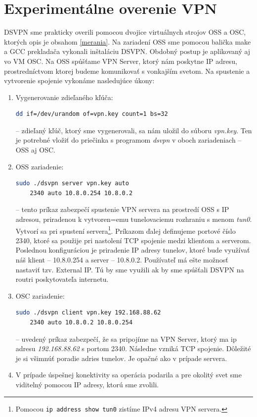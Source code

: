 \section{Experimentálne overenie VPN}
DSVPN sme prakticky overili pomocou dvojice virtuálnych strojov OSS a OSC, ktorých opis je obsahom \ref{merania}. Na zariadení OSS sme pomocou balička make a GCC prekladača vykonali inštaláciu DSVPN. Obdobný postup je aplikovaný aj vo VM OSC. Na OSS spúšťame VPN Server, ktorý nám poskytne IP adresu, prostredníctvom ktorej budeme komunikovať s vonkajším svetom. Na spustenie a vytvorenie spojenie vykonáme nasledujúce úkony:
\begin{enumerate}
	\item Vygenerovanie zdieľaného kľúča:\begin{lstlisting}[language=bash]
		dd if=/dev/urandom of=vpn.key count=1 bs=32
	\end{lstlisting} 
-- zdieľaný kľúč, ktorý sme vygenerovali, sa nám uložil do súboru \textit{vpn.key}. Ten je potrebné vložiť do priečinka s programom \textit{dsvpn} v oboch zariadeniach -- OSS aj OSC. 
	\item OSS zariadenie: \begin{lstlisting}[language=bash] 
	sudo ./dsvpn server vpn.key auto 
	2340 auto 10.8.0.254 10.8.0.2
	\end{lstlisting} 
-- tento príkaz zabezpečí spustenie VPN servera na prostredí OSS s IP adresou, priradenou k vytvoren=emu tunelovaciemu rozhraniu s menom \textit{tun0}. Vytvorí sa pri spustení servera\footnote{Pomocou \lstinline|ip address show tun0| zistíme IPv4 adresu VPN servera.}. Príkazom ďalej definujeme portové číslo 2340, ktoré sa použije pri nastolení TCP spojenie medzi klientom a serverom. Poslednou konfiguráciou je priradenie IP adresy tunelov, ktoré bude využívať náš klient -- 10.8.0.254 a server -- 10.8.0.2. Používateľ má ešte možnosť nastaviť tzv. External IP. Tú by sme využili ak by sme spúšťali DSVPN na routri poskytovateľa internetu.  
	\item OSC zariadenie: \begin{lstlisting}[language=bash] 
	sudo ./dsvpn client vpn.key 192.168.88.62 
	2340 auto 10.8.0.2 10.8.0.254
	\end{lstlisting} 
-- uvedený príkaz zabezpečí, že sa pripojíme na VPN Server, ktorý ma ip adresu \textit{192.168.88.62} s portom 2340. Následne vzniká TCP spojenie. Dôležité je si všimnúť poradie adries tunelov. Je opačné ako v prípade servera. 
	\item V prípade úspešnej konektivity sa operácia podarila a pre okolitý svet sme viditelný pomocou IP adresy, ktorú sme zvolili. 
\end{enumerate}

